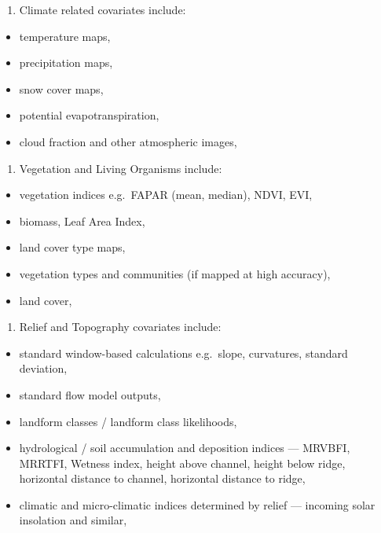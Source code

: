 \documentclass[graybox,natbib,nospthms,UStrade]{svmono}
\providecommand{\tightlist}{%
  \setlength{\itemsep}{0pt}\setlength{\parskip}{0pt}}
\providecommand{\tightlist}{\setlength{\itemsep}{0pt}\setlength{\parskip}{0pt}}
\begin{document}
\begin{enumerate}
\def\labelenumi{\arabic{enumi}.}
\tightlist
\item
  Climate related covariates include:
\end{enumerate}

\begin{itemize}
\tightlist
\item
  temperature maps,
\item
  precipitation maps,
\item
  snow cover maps,
\item
  potential evapotranspiration,
\item
  cloud fraction and other atmospheric images,
\end{itemize}

\begin{enumerate}
\def\labelenumi{\arabic{enumi}.}
\setcounter{enumi}{1}
\tightlist
\item
  Vegetation and Living Organisms include:
\end{enumerate}

\begin{itemize}
\tightlist
\item
  vegetation indices e.g.~FAPAR (mean, median), NDVI, EVI,
\item
  biomass, Leaf Area Index,
\item
  land cover type maps,
\item
  vegetation types and communities (if mapped at high accuracy),
\item
  land cover,
\end{itemize}

\begin{enumerate}
\def\labelenumi{\arabic{enumi}.}
\setcounter{enumi}{2}
\tightlist
\item
  Relief and Topography covariates include:
\end{enumerate}

\begin{itemize}
\tightlist
\item
  standard window-based calculations e.g.~slope, curvatures, standard deviation,
\item
  standard flow model outputs,
\item
  landform classes / landform class likelihoods,
\item
  hydrological / soil accumulation and deposition indices --- MRVBFI, MRRTFI, Wetness index, height above channel, height below ridge, horizontal distance to channel, horizontal distance to ridge,
\item
  climatic and micro-climatic indices determined by relief --- incoming solar insolation and similar,
\end{itemize}
\end{document}
